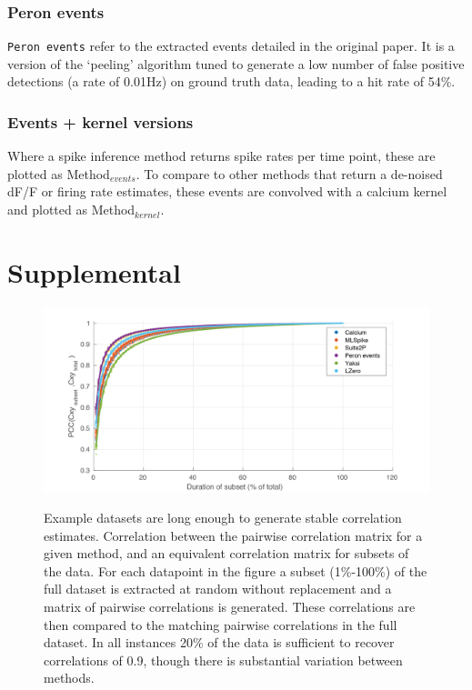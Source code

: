 \documentclass[a4paper,10pt,twocolumn]{article}
\newcommand{\beginsupplement}{%
        \setcounter{table}{0}
        \renewcommand{\thetable}{S\arabic{table}}%
        \setcounter{figure}{0}
        \renewcommand{\thefigure}{S\arabic{figure}}%
     }
\begin{document}
\subsubsection*{Peron events}
\texttt{Peron events} refer to the extracted events detailed in the original \cite{Peron2015-kd} paper. It is a version of the `peeling' algorithm \citep{Lutcke2013-wu} tuned to generate a low number of false positive detections (a rate of 0.01Hz) on ground truth data, leading to a hit rate of 54$\%$. 

\subsubsection*{Events + kernel versions}
Where a spike inference method returns spike rates per time point, these are plotted as Method$_{events}$. To compare to other methods that return a de-noised dF/F or firing rate estimates, these events are convolved with a calcium kernel and plotted as Method$_{kernel}$.

\clearpage
\beginsupplement
\section{Supplemental}

\begin{figure}[h!]
{\includegraphics[trim={30 20 60 20},clip,width=\textwidth]{figs/cxy_subset_comparison3.png}}
{\caption{\label{fig:supp_cxy_stability}Example datasets are long enough to generate stable correlation estimates. Correlation between the pairwise correlation matrix for a given method, and an equivalent correlation matrix for subsets of the data. For each datapoint in the figure a subset (1\%-100\%) of the full dataset is extracted at random without replacement and a matrix of pairwise correlations is generated. These correlations are then compared to the matching pairwise correlations in the full dataset. In all instances 20\% of the data is sufficient to recover correlations of 0.9, though there is substantial variation between methods.}}%
\end{figure} %
\end{document}

